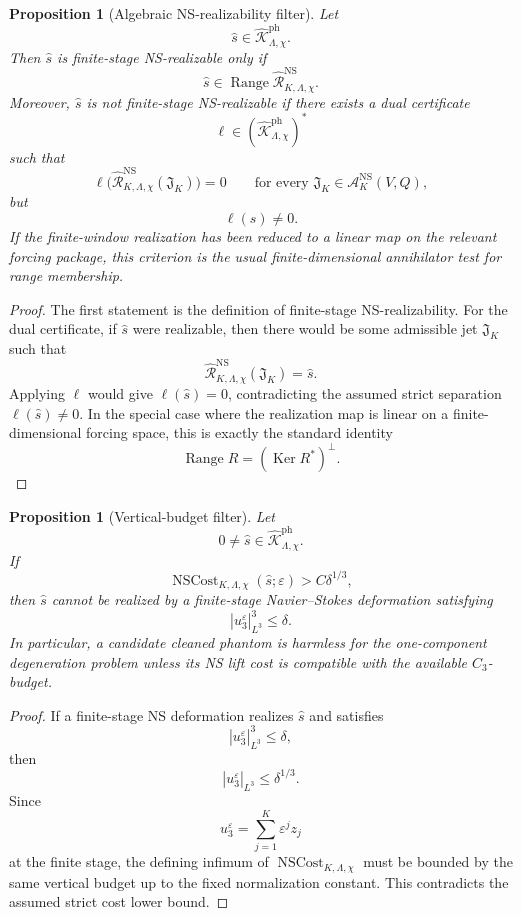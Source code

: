 \documentclass[11pt]{article}
\numberwithin{equation}{section}
\newtheorem{proposition}[theorem]{Proposition}
\DeclareMathOperator{\Range}{Range}
\DeclareMathOperator{\Ker}{Ker}
\begin{document}
\begin{proposition}[Algebraic NS-realizability filter]\label{prop:algebraic-NS-realizability-filter}
Let
\[
        \widehat s\in
        \widehat{\mathcal K}_{\Lambda,\chi}^{\mathrm{ph}}.
\]
Then \(\widehat s\) is finite-stage NS-realizable only if
\[
        \widehat s
        \in
        \Range \widehat{\mathcal R}_{K,\Lambda,\chi}^{\mathrm{NS}}.
\]
Moreover, \(\widehat s\) is not finite-stage NS-realizable if there exists a dual certificate
\[
        \ell\in
        \left(\widehat{\mathcal K}_{\Lambda,\chi}^{\mathrm{ph}}\right)^*
\]
such that
\[
        \ell\bigl(\widehat{\mathcal R}_{K,\Lambda,\chi}^{\mathrm{NS}}(\mathfrak J_K)\bigr)=0
        \qquad
        \text{for every }
        \mathfrak J_K\in\mathcal A_K^{\mathrm{NS}}(V,Q),
\]
but
\[
        \ell(\widehat s)\neq0.
\]
If the finite-window realization has been reduced to a linear map on the relevant forcing package, this criterion is the usual finite-dimensional annihilator test for range membership.
\end{proposition}

\begin{proof}
The first statement is the definition of finite-stage NS-realizability.  For the dual certificate, if \(\widehat s\) were realizable, then there would be some admissible jet \(\mathfrak J_K\) such that
\[
        \widehat{\mathcal R}_{K,\Lambda,\chi}^{\mathrm{NS}}(\mathfrak J_K)=\widehat s.
\]
Applying \(\ell\) would give \(\ell(\widehat s)=0\), contradicting the assumed strict separation \(\ell(\widehat s)\neq0\).  In the special case where the realization map is linear on a finite-dimensional forcing space, this is exactly the standard identity
\[
        \Range R=(\Ker R^*)^\perp.
\]
\end{proof}

\begin{proposition}[Vertical-budget filter]\label{prop:vertical-budget-filter}
Let
\[
        0\neq\widehat s\in
        \widehat{\mathcal K}_{\Lambda,\chi}^{\mathrm{ph}}.
\]
If
\[
        \operatorname{NSCost}_{K,\Lambda,\chi}(\widehat s;\varepsilon)
        > C\delta^{1/3},
\]
then \(\widehat s\) cannot be realized by a finite-stage Navier--Stokes deformation satisfying
\[
        |u_3^\varepsilon|_{L^3}^3\le\delta.
\]
In particular, a candidate cleaned phantom is harmless for the one-component degeneration problem unless its NS lift cost is compatible with the available \(C_3\)-budget.
\end{proposition}

\begin{proof}
If a finite-stage NS deformation realizes \(\widehat s\) and satisfies
\[
        |u_3^\varepsilon|_{L^3}^3\le\delta,
\]
then
\[
        |u_3^\varepsilon|_{L^3}\le\delta^{1/3}.
\]
Since
\[
        u_3^\varepsilon
        =\sum_{j=1}^K\varepsilon^j z_j
\]
at the finite stage, the defining infimum of \(\operatorname{NSCost}_{K,\Lambda,\chi}\) must be bounded by the same vertical budget up to the fixed normalization constant.  This contradicts the assumed strict cost lower bound.
\end{proof}
\end{document}
